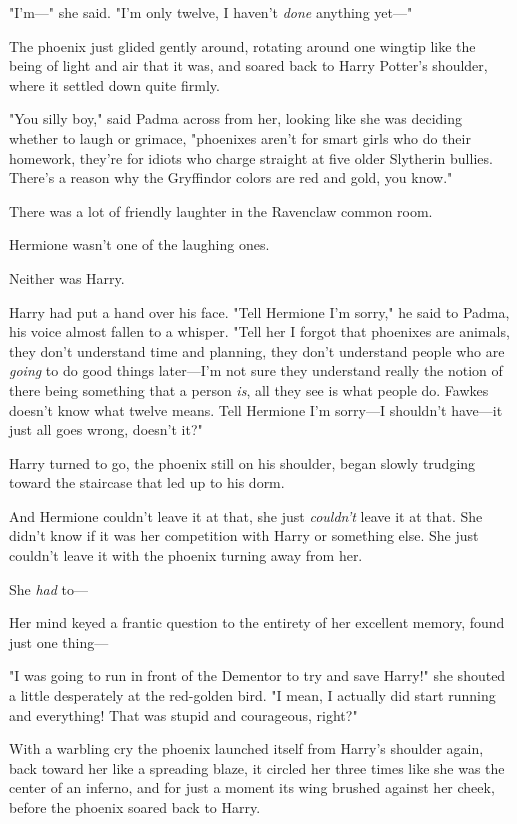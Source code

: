 "I'm---" she said. "I'm only twelve, I haven't \emph{done} anything yet---"

The phoenix just glided gently around, rotating around one wingtip like the 
being of light and air that it was, and soared back to Harry Potter's shoulder, 
where it settled down quite firmly.

"You silly boy," said Padma across from her, looking like she was deciding 
whether to laugh or grimace, "phoenixes aren't for smart girls who do their 
homework, they're for idiots who charge straight at five older Slytherin 
bullies. There's a reason why the Gryffindor colors are red and gold, you know."

There was a lot of friendly laughter in the Ravenclaw common room.

Hermione wasn't one of the laughing ones.

Neither was Harry.

Harry had put a hand over his face. "Tell Hermione I'm sorry," he said to 
Padma, his voice almost fallen to a whisper. "Tell her I forgot that phoenixes 
are animals, they don't understand time and planning, they don't understand 
people who are \emph{going} to do good things later---I'm not sure they 
understand really the notion of there being something that a person \emph{is}, 
all they see is what people do. Fawkes doesn't know what twelve means. Tell 
Hermione I'm sorry---I shouldn't have---it just all goes wrong, doesn't it?"

Harry turned to go, the phoenix still on his shoulder, began slowly trudging 
toward the staircase that led up to his dorm.

And Hermione couldn't leave it at that, she just \emph{couldn't} leave it at 
that. She didn't know if it was her competition with Harry or something else. 
She just couldn't leave it with the phoenix turning away from her.

She \emph{had} to---

Her mind keyed a frantic question to the entirety of her excellent memory, 
found just one thing---

"I was going to run in front of the Dementor to try and save Harry!" she 
shouted a little desperately at the red-golden bird. "I mean, I actually did 
start running and everything! That was stupid and courageous, right?"

With a warbling cry the phoenix launched itself from Harry's shoulder again, 
back toward her like a spreading blaze, it circled her three times like she was 
the center of an inferno, and for just a moment its wing brushed against her 
cheek, before the phoenix soared back to Harry.

